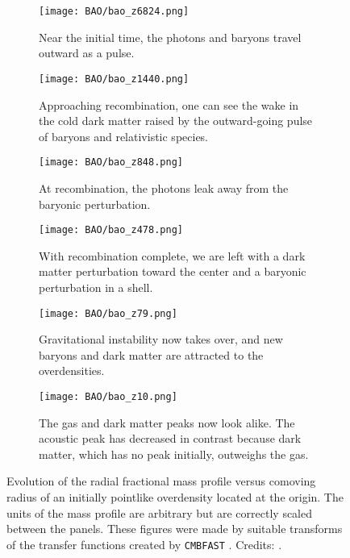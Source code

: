 \begin{figure}
\centering
\begin{subfigure}{0.49\textwidth}
\centering
\texttt{[image: BAO/bao\_z6824.png]}
\caption{Near the initial time, the photons and baryons travel outward as a pulse.}\label{fig:bao_z6824}
\end{subfigure}
\hfill
\begin{subfigure}{0.49\textwidth}
\centering
\texttt{[image: BAO/bao\_z1440.png]}
\caption{Approaching recombination, one can see the wake in the cold dark matter raised by the outward-going pulse of
baryons and relativistic species.}\label{fig:bao_z1440}
\end{subfigure}

\begin{subfigure}{0.49\textwidth}
\centering
\texttt{[image: BAO/bao\_z848.png]}
\caption{At recombination, the photons leak away from the baryonic perturbation.}\label{fig:bao_z848}
\end{subfigure}
\hfill
\begin{subfigure}{0.49\textwidth}
\centering
\texttt{[image: BAO/bao\_z478.png]}
\caption{With recombination complete, we are left with a dark matter perturbation toward the center and a baryonic
perturbation in a shell.}\label{fig:bao_z478}
\end{subfigure}

\begin{subfigure}{0.49\textwidth}
\centering
\texttt{[image: BAO/bao\_z79.png]}
\caption{Gravitational instability now takes over, and new baryons and dark matter are attracted to the overdensities.}
\label{fig:bao_z79}
\end{subfigure}
\hfill
\begin{subfigure}{0.49\textwidth}
\centering
\texttt{[image: BAO/bao\_z10.png]}
\caption{The gas and dark matter peaks now look alike. The acoustic peak has decreased in contrast because dark matter,
which has no peak initially, outweighs the gas.}\label{fig:bao_z10}
\end{subfigure}

\caption{Evolution of the radial fractional mass profile versus comoving radius of an
initially pointlike overdensity located at the origin. The units of the mass profile are arbitrary but are correctly scaled between the 
panels. These figures were made by suitable transforms of the transfer functions created by \texttt{CMBFAST} \citep{Seljak1996, 
Zaldarriaga2000}. Credits: \citet{Eisenstein2007}.}\label{fig:bao_propagation}
\end{figure}

